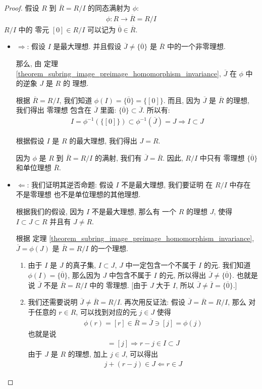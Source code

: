 \documentclass[utf8]{ctexbook}
\theoremstyle{definition}
\begin{document}
\begin{proof}
假设 $R$ 到 $\overline{R} = R/I$ 的同态满射为 $\phi$:
\begin{align*}
\phi: R \longrightarrow \overline{R} = R/I
\end{align*}
$R/I$ 中的 零元 $[0] \in R/I $ 可以记为 $\overline{0} \in \overline{R} $.

\begin{itemize}
\item{$\Longrightarrow$: 假设 $I$ 是最大理想. 并且假设 $\overline{J} \neq \{ \overline{0} \}$ 是 $\overline{R}$ 中的一个非零理想. 

那么, 由 定理 \ref{theorem_subring_image_preimage_homomorphism_invariance}, $\overline{J}$ 在 $\phi$ 中的逆象 $J$ 是 $R$ 的 理想. 

根据 $\overline{R}= R/I$, 我们知道 $\phi(I) = \{ \overline{0} \} = \{ [0] \}$. 而且, 因为 $\overline{J}$ 是 $\overline{R}$ 的理想, 我们得出 零理想 包含在 $\overline{J}$ 里面: $ \{ \overline{0} \} \subset \overline{J} $. 所以有:
\begin{align*}
I = \phi^{-1} (\{ [0] \}) \subset \phi^{-1} (\overline{J}) = J \Longrightarrow I \subset J
\end{align*}

根据假设 $I$ 是 $R$ 的最大理想, 我们得出 $J = R$.

因为 $\phi$ 是 $R$ 到 $\overline{R} =  R/I$ 的满射, 我们有 $\overline{J} = \overline{R} $. 因此, $R/I$ 中只有 零理想 $\{ \overline{0} \}$ 和单位理想 $\overline{R}$.
}
\item{$\Longleftarrow$: 我们证明其逆否命题: 假设 $I$ 不是最大理想, 我们要证明 在 $R/I$ 中存在 不是零理想 也不是单位理想的其他理想.

根据我们的假设, 因为 $I$ 不是最大理想, 那么有 一个 $R$ 的理想 $J$, 使得 $I \subset J \subset R$ 并且有 $J \neq R$. 

根据 定理 \ref{theorem_subring_image_preimage_homomorphism_invariance}, $\overline{J} = \phi(J) $ 是 $\overline{R} = R/I$ 的一个理想.

\begin{enumerate}
\item{由于 $I$ 是 $J$ 的真子集, $I \subset J$, $J$ 中一定包含一个不属于 $I$ 的元. 我们知道 $\phi(I) = \{ \overline{0} \}$, 那么因为 $J$ 中包含不属于 $I$ 的元, 所以得出 $\overline{J} \neq \{ \overline{0 }\}$. 也就是说 $\overline{J}$ 不是 $\overline{R} = R/I$ 中的 零理想. [由于 $J$ 大于 $I$, 所以 $\overline{J} \neq \overline{I} = \{ \overline{0} \}$.]}
\item{我们还需要说明 $\overline{J} \neq \overline{R} = R/I$. 再次用反证法: 假设 $\overline{J} = \overline{R} = R/I$, 那么 对于任意的 $r \in R$, 可以找到对应的元 $j \in J$ 使得 
\begin{align*}
\phi(r) = [r] \in \overline{R} =  \overline{J} \ni [j] = \phi(j)
\end{align*}
也就是说
\begin{align*}
[r] = [j] \Longrightarrow r - j \in I \subset J
\end{align*}
由于 $J$ 是 $R$ 的理想, 加上 $j \in J$, 可以得出
\begin{align*}
j + (r - j) \in J \Longleftarrow r \in J
\end{align*}

}
\end{enumerate}}
\end{itemize}
\end{proof}
\end{document}
